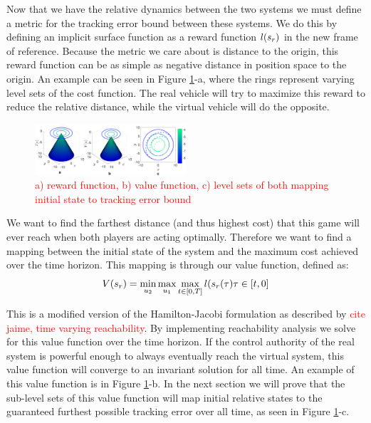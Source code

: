 Now that we have the relative dynamics between the two systems we must define a metric for the tracking error bound between these systems. We do this by defining an implicit surface function as a reward function $l(s_r)$ in the new frame of reference. Because the metric we care about is distance to the origin, this reward function can be as simple as negative distance in position space to the origin. An example can be seen in Figure \ref{fig:quad4D_example}-a, where the rings represent varying level sets of the cost function. The real vehicle will try to maximize this reward to reduce the relative distance, while the virtual vehicle will do the opposite.

\begin{figure}
	\centering
	\includegraphics[width=0.5\textwidth]{fig/quad4D_example}
	\caption{\textcolor{red}{a) reward function, b) value function, c) level sets of both mapping initial state to tracking error bound}}
	\label{fig:quad4D_example}
\end{figure} 
 
 We want to find the farthest distance (and thus highest cost) that this game will ever reach when both players are acting optimally. Therefore we want to find a mapping between the initial state of the system and the maximum cost achieved over the time horizon. This mapping is through our value function, defined as:
 \begin{equation}
 	V(s_r)= \min_{u_2} \max_{u_1} \max_{t\in [0,T]} l(s_r(\tau)
 	\tau \in [t, 0]
 \end{equation} 
 
 This is a modified version of the Hamilton-Jacobi formulation as described by \textcolor{red}{cite jaime, time varying reachability}. By implementing reachability analysis we solve for this value function over the time horizon. If the control authority of the real system is powerful enough to always eventually reach the virtual system, this value function will converge to an invariant solution for all time.  An example of this value function is in Figure \ref{fig:quad4D_example}-b. In the next section we will prove that the sub-level sets of this value function will map initial relative states to the guaranteed furthest possible tracking error over all time, as seen in Figure \ref{fig:quad4D_example}-c.
 
